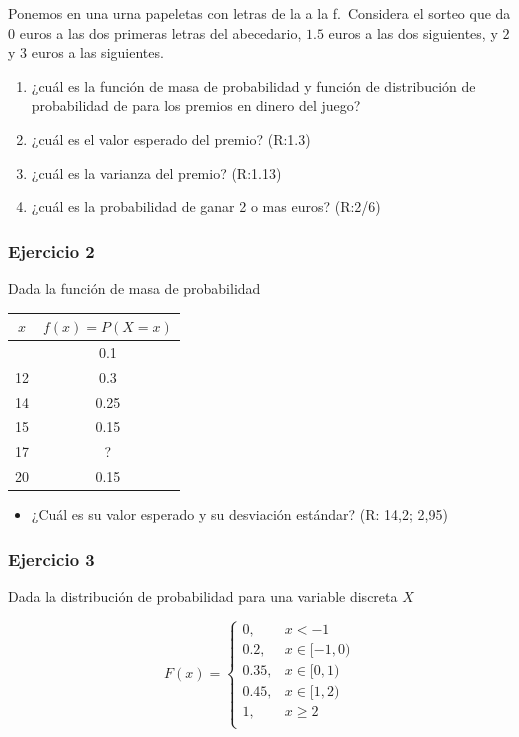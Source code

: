 \documentclass[
]{book}
\providecommand{\tightlist}{%
  \setlength{\itemsep}{0pt}\setlength{\parskip}{0pt}}
\begin{document}
Ponemos en una urna papeletas con letras de la a la f.~Considera el sorteo que da \(0\) euros a las dos primeras letras del abecedario, \(1.5\) euros a las dos siguientes, y \(2\) y \(3\) euros a las siguientes.

\begin{enumerate}
\def\labelenumi{\alph{enumi})}
\item
  ¿cuál es la función de masa de probabilidad y función de distribución de probabilidad de para los premios en dinero del juego?
\item
  ¿cuál es el valor esperado del premio? (R:1.3)
\item
  ¿cuál es la varianza del premio? (R:1.13)
\item
  ¿cuál es la probabilidad de ganar 2 o mas euros? (R:2/6)
\end{enumerate}

\hypertarget{ejercicio-2-2}{%
\subsubsection{Ejercicio 2}\label{ejercicio-2-2}}

Dada la función de masa de probabilidad

\begin{longtable}[]{@{}cc@{}}
\toprule\noalign{}
\(x\) & \(f(x)=P(X=x)\) \\
\midrule\noalign{}
\endhead
\bottomrule\noalign{}
\endlastfoot
10 & 0.1 \\
12 & 0.3 \\
14 & 0.25 \\
15 & 0.15 \\
17 & ? \\
20 & 0.15 \\
\end{longtable}

\begin{itemize}
\tightlist
\item
  ¿Cuál es su valor esperado y su desviación estándar? (R: 14,2; 2,95)
\end{itemize}

\hypertarget{ejercicio-3-2}{%
\subsubsection{Ejercicio 3}\label{ejercicio-3-2}}

Dada la distribución de probabilidad para una variable discreta \(X\)

\[
    F(x)= 
\begin{cases}
0, & x < -1 \\
0.2,& x \in [-1,0)\\
0.35,& x \in [0,1)\\
0.45,& x \in [1,2)\\
1,& x \geq 2\\
\end{cases}
\]
\end{document}
